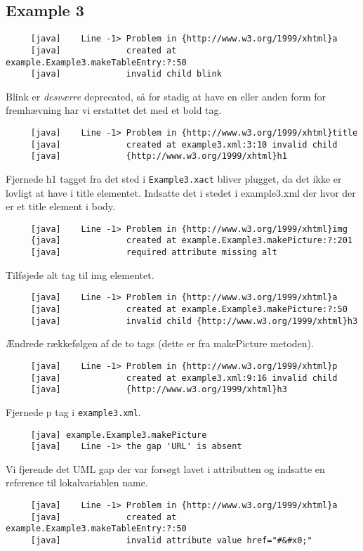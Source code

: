 \documentclass[a4paper,10pt]{article}
\begin{document}
\subsection*{Example 3}
\begin{lstlisting}
     [java]    Line -1> Problem in {http://www.w3.org/1999/xhtml}a
     [java]             created at example.Example3.makeTableEntry:?:50 
     [java]             invalid child blink
\end{lstlisting}
Blink er \emph{desværre} deprecated, så for stadig at have en eller anden form for fremhævning har vi erstattet det med et bold tag.
\begin{lstlisting}
     [java]    Line -1> Problem in {http://www.w3.org/1999/xhtml}title 
     [java]             created at example3.xml:3:10 invalid child 
     [java]             {http://www.w3.org/1999/xhtml}h1
\end{lstlisting}
Fjernede h1 tagget fra det sted i \texttt{Example3.xact} bliver plugget, da det ikke er lovligt at have i title elementet. Indsatte det i stedet i example3.xml der hvor der er et title element i body.
\begin{lstlisting}
     [java]    Line -1> Problem in {http://www.w3.org/1999/xhtml}img 
     {java]             created at example.Example3.makePicture:?:201
     [java]             required attribute missing alt
\end{lstlisting}
Tilføjede alt tag til img elementet.
\begin{lstlisting}
     [java]    Line -1> Problem in {http://www.w3.org/1999/xhtml}a 
     [java]             created at example.Example3.makePicture:?:50
     [java]             invalid child {http://www.w3.org/1999/xhtml}h3
\end{lstlisting}
Ændrede rækkefølgen af de to tags (dette er fra makePicture metoden).
\begin{lstlisting}
     [java]    Line -1> Problem in {http://www.w3.org/1999/xhtml}p 
     [java]             created at example3.xml:9:16 invalid child 
     [java]             {http://www.w3.org/1999/xhtml}h3
\end{lstlisting}
Fjernede p tag i \texttt{example3.xml}.
\begin{lstlisting}
     [java] example.Example3.makePicture
     [java]    Line -1> the gap 'URL' is absent
\end{lstlisting}
Vi fjerende det UML gap der var forsøgt lavet i attributten og indsatte en reference til lokalvariablen name.
\begin{lstlisting}
     [java]    Line -1> Problem in {http://www.w3.org/1999/xhtml}a 
     [java]             created at example.Example3.makeTableEntry:?:50
     [java]             invalid attribute value href="#&#x0;"
\end{lstlisting}
\end{document}
